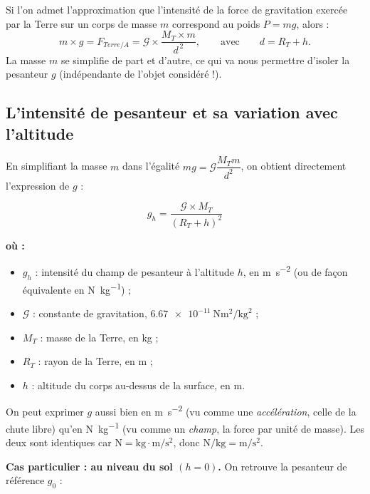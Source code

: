 \documentclass[11pt,a4paper]{article}
\newenvironment{ou}{%
  \par\smallskip\noindent\textbf{où :}\nopagebreak
  \begin{itemize}[leftmargin=1.8em,topsep=2pt,itemsep=1.5pt,parsep=0pt]}%
  {\end{itemize}}
\newcommand{\Grav}{\mathcal{G}}        %
\begin{document}
\begin{theoreme}
Si l'on admet l'approximation que l'intensité de la force de gravitation exercée par la
Terre sur un corps de masse $m$ correspond au poids $P=mg$, alors :
\[
m\times g = F_{Terre/A}=\Grav\times\dfrac{M_T\times m}{d^{\,2}},
\qquad\text{avec}\qquad d=R_T+h .
\]
La masse $m$ se simplifie de part et d'autre, ce qui va nous permettre d'isoler la
pesanteur $g$ (indépendante de l'objet considéré !).
\end{theoreme}

\subsection{L'intensité de pesanteur et sa variation avec l'altitude}

En simplifiant la masse $m$ dans l'égalité $mg=\Grav\dfrac{M_T m}{d^2}$, on obtient
directement l'expression de $g$ :

\begin{formule}
\[
\boxed{\;g_h=\dfrac{\Grav\times M_T}{(R_T+h)^2}\;}
\]
\begin{ou}
  \item $g_h$ : intensité du champ de pesanteur à l'altitude $h$, en \si{\metre\per\second\squared}
        (ou de façon équivalente en \si{\newton\per\kilogram}) ;
  \item $\Grav$ : constante de gravitation, $\SI{6.67e-11}{\newton\metre\squared\per\kilogram\squared}$ ;
  \item $M_T$ : masse de la Terre, en \si{\kilogram} ;
  \item $R_T$ : rayon de la Terre, en \si{\metre} ;
  \item $h$ : altitude du corps au-dessus de la surface, en \si{\metre}.
\end{ou}
\end{formule}

\begin{remarque}
On peut exprimer $g$ aussi bien en \si{\metre\per\second\squared} (vu comme une
\emph{accélération}, celle de la chute libre) qu'en \si{\newton\per\kilogram} (vu comme
un \emph{champ}, la force par unité de masse). Les deux sont identiques car
$\si{\newton}=\si{\kilogram}\cdot\si{\metre\per\second\squared}$, donc
$\si{\newton\per\kilogram}=\si{\metre\per\second\squared}$.
\end{remarque}

\noindent\textbf{Cas particulier : au niveau du sol $(h=0)$.} On retrouve la pesanteur
de référence $g_0$ :
\end{document}
